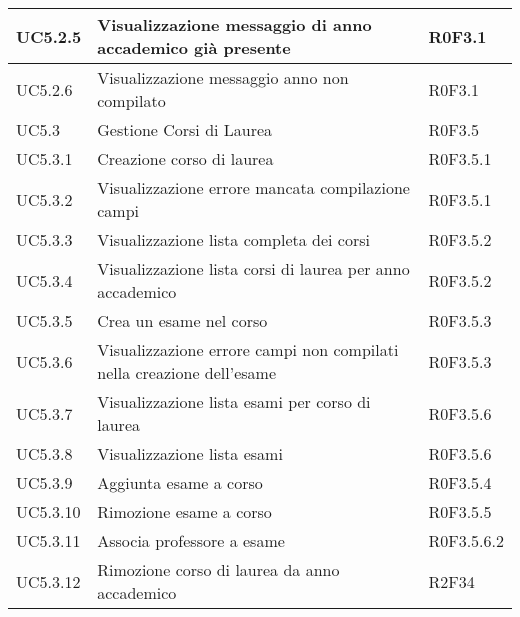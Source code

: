 \documentclass[AnalisiDeiRequisiti.tex]{subfiles}
\begin{document}
\begin{longtable}[H]{|p{2cm}|p{5cm}|p{5cm}|}
	UC5.2.5 & Visualizzazione messaggio di anno accademico già presente & R0F3.1 \\ \hline
	UC5.2.6 & Visualizzazione messaggio anno non compilato &  R0F3.1 \\ \hline
	UC5.3 & Gestione Corsi di Laurea &  R0F3.5 \\  \hline
	UC5.3.1 & Creazione corso di laurea &  R0F3.5.1 \\ \hline
	UC5.3.2 & Visualizzazione errore mancata compilazione campi & R0F3.5.1 \\ \hline
	UC5.3.3 & Visualizzazione lista completa dei corsi &  R0F3.5.2 \\ \hline
	UC5.3.4 & Visualizzazione lista corsi di laurea per anno accademico & R0F3.5.2  \\ \hline
	UC5.3.5 & Crea un esame nel corso &  R0F3.5.3\\ \hline
	UC5.3.6 & Visualizzazione errore campi non compilati nella creazione dell'esame & R0F3.5.3  \\ \hline
	UC5.3.7 & Visualizzazione lista esami per corso di laurea & R0F3.5.6 \\ \hline
	UC5.3.8 & Visualizzazione lista esami &  R0F3.5.6 \\ \hline
	UC5.3.9 & Aggiunta esame a corso &  R0F3.5.4 \\ \hline
	UC5.3.10 & Rimozione esame a corso &  R0F3.5.5 \\ \hline
	UC5.3.11 & Associa professore a esame & R0F3.5.6.2 \\ \hline
	UC5.3.12 & Rimozione corso di laurea da anno accademico & R2F34 \\ \hline
	

\end{longtable}
\end{document}
